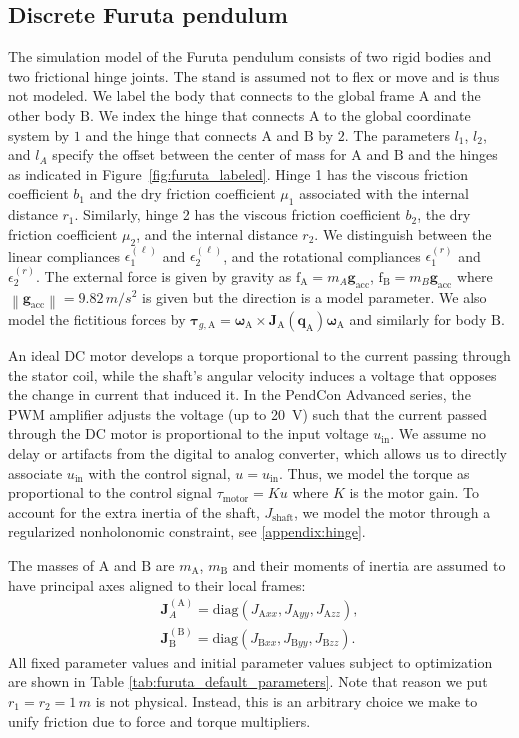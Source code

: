 \documentclass[preprint,12pt]{elsarticle}
\let\vec\bm
\let\mat\mathbf
\newcommand\figref{Figure~\ref}
\newcommand{\norm}[1]{\left\lVert#1\right\rVert}
\numberwithin{equation}{section}
\def\angvel{\vec{\omega}}
\def\conf{q}
\def\tA{\text{A}}
\def\tB{\text{B}}
\begin{document}
\subsection{Discrete Furuta pendulum}
The simulation model of the Furuta pendulum consists of two rigid bodies and two frictional hinge joints.
The stand is assumed not to flex or move and is thus not modeled.
We label the body that connects to the global frame $\tA$ and the other body $\tB$.
We index the hinge that connects $\tA$ to the global coordinate system by $1$ and the hinge that connects $\tA$ and $\tB$ by $2$.
The parameters $l_1$, $l_2$, and $l_A$ specify the offset between the center of mass for $\tA$ and $\tB$ and the hinges as indicated in \figref{fig:furuta_labeled}.
Hinge 1 has the viscous friction coefficient $b_1$ and the dry friction coefficient $\mu_1$ associated with the internal distance $r_1$.
Similarly, hinge 2 has the viscous friction coefficient $b_2$, the dry friction coefficient $\mu_2$, and the internal distance $r_2$.
We distinguish between the linear compliances $\epsilon_1^{(\ell)}$ and $\epsilon_2^{(\ell)}$, and the rotational compliances $\epsilon_1^{(r)}$ and $\epsilon_2^{(r)}$.
The external force is given by gravity as $\vec{\mathrm{f}}_\tA = m_A \vec{g}_{\text{acc}}$, $\vec{\mathrm{f}}_\tB= m_B \vec{g}_{\text{acc}}$ where $\norm{\vec{g}_{\text{acc}}} = 9.82\,\si{m/s^2}$ is given but the direction is a model parameter.
We also model the fictitious forces by $\vec{\tau}_{g, \tA} =\angvel_\tA \times \mat{J}_\tA(\vec{\conf}_\tA) \angvel_\tA$ and similarly for body $\tB$.

An ideal DC motor develops a torque proportional to the current passing through the stator coil, while the shaft's angular velocity induces a voltage that opposes the change in current that induced it.
In the PendCon Advanced series, the PWM amplifier adjusts the voltage (up to \SI{20}{V}) such that the current passed through the DC motor is proportional to the input voltage $u_{\text{in}}$.
We assume no delay or artifacts from the digital to analog converter, which allows us to directly associate $u_{\text{in}}$ with the control signal, $u = u_{\text{in}}$.
Thus, we model the torque as proportional to the control signal $\tau_{\text{motor}} = K u$ where $K$ is the motor gain.
To account for the extra inertia of the shaft, $J_{\text{shaft}}$, we model the motor through a regularized nonholonomic constraint, see \ref{appendix:hinge}.

The masses of $\tA$ and $\tB$ are $m_\tA$, $m_\tB$ and their moments of inertia are assumed to have principal axes aligned to their local frames:
\begin{eqnarray}
    \mat{J}_A^{(\tA)} = \text{diag}(J_{\tA xx}, J_{\tA yy}, J_{\tA zz}), \nonumber \\
    \mat{J}_\tB^{(\tB)} = \text{diag}(J_{\tB xx}, J_{\tB yy}, J_{\tB zz}).
\end{eqnarray}
All fixed parameter values and initial parameter values subject to optimization are shown in Table \ref{tab:furuta_default_parameters}.
Note that reason we put $r_1 = r_2 = 1\,\si{m}$ is not physical.
Instead, this is an arbitrary choice we make to unify friction due to force and torque multipliers.
\end{document}
